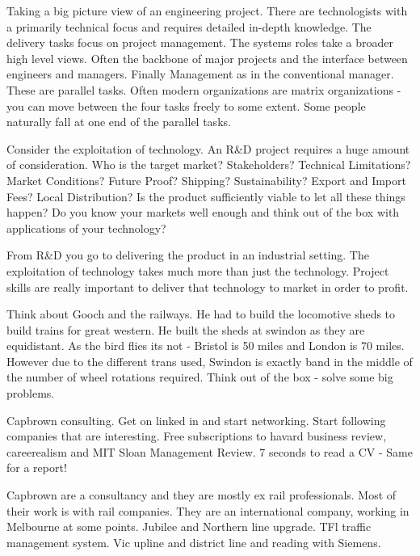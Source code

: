 Taking a big picture view of an engineering project. There are technologists with a primarily technical focus and requires detailed in-depth knowledge. The delivery tasks focus on project management. The systems roles take a broader high level views. Often the backbone of major projects and the interface between engineers and managers. Finally Management as in the conventional manager. These are parallel tasks. Often modern organizations are matrix organizations - you can move between the four tasks freely to some extent. Some people naturally fall at one end of the parallel tasks.

Consider the exploitation of technology. An R\&D project requires a huge amount of consideration. Who is the target market? Stakeholders? Technical Limitations? Market Conditions? Future Proof? Shipping? Sustainability? Export and Import Fees? Local Distribution? Is the product sufficiently viable to let all these things happen? Do you know your markets well enough and think out of the box with applications of your technology?

From R\&D you go to delivering the product in an industrial setting. The exploitation of technology takes much more than just the technology. Project skills are really important to deliver that technology to market in order to profit.

Think about Gooch and the railways. He had to build the locomotive sheds to build trains for great western. He built the sheds at swindon as they are equidistant. As the bird flies its not - Bristol is 50 miles and London is 70 miles. However due to the different trans used, Swindon is exactly band in the middle of the number of wheel rotations required. Think out of the box - solve some big problems.

Capbrown consulting. Get on linked in and start networking. Start following companies that are interesting. Free subscriptions to havard business review, careerealism and MIT Sloan Management Review. 7 seconds to read a CV - Same for a report!

Capbrown are a consultancy and they are mostly ex rail professionals. Most of their work is with rail companies. They are an international company, working in Melbourne at some points. Jubilee and Northern line upgrade. TFl traffic management system. Vic upline and district line and reading with Siemens. 


